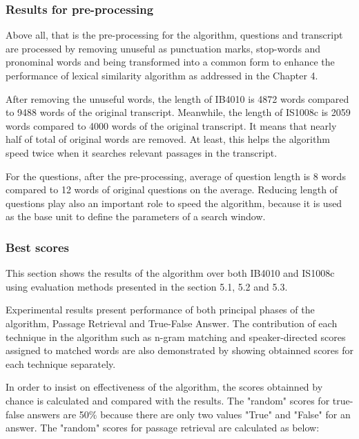 \documentclass[10pt,a4paper]{article}
\numberwithin{algorithm}{section}  %
\begin{document}


\subsubsection*{Results for pre-processing}
Above all, that is the pre-processing for the algorithm, questions and transcript are processed by removing unuseful as punctuation marks, stop-words and pronominal words and being transformed into a common form to enhance the performance of lexical similarity algorithm as addressed in the Chapter 4. 

After removing the unuseful words, the length of IB4010 is 4872 words compared to 9488 words of the original transcript. Meanwhile, the length of IS1008c is 2059 words compared to 4000 words of the original transcript. It means that nearly half of total of original words are removed. At least, this helps the algorithm speed twice when it searches relevant passages in the transcript.

For the questions, after the pre-processing, average of question length is 8 words compared to 12 words of original questions on the average. Reducing length of questions play also an important role to speed the algorithm, because it is used as the base unit to define the parameters of a search window.

\subsubsection*{Best scores}
This section shows the results of the algorithm over both IB4010 and IS1008c using evaluation methods presented in the section 5.1, 5.2 and 5.3.

Experimental results present performance of both principal phases of the algorithm, Passage Retrieval and True-False Answer. The contribution of each technique in the algorithm such as n-gram matching and speaker-directed scores assigned to matched words are also demonstrated by showing obtainned scores for each technique separately. 

In order to insist on effectiveness of the algorithm, the scores obtainned by chance is calculated and compared with the results. The "random" scores for true-false answers are 50\% because there are only two values "True" and "False" for an answer. The "random" scores for passage retrieval are calculated as below:
\end{document}
